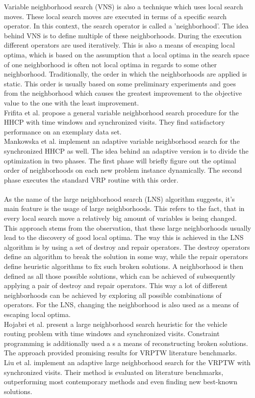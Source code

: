 Variable neighborhood search (VNS) is also a technique which uses local search moves. These local search moves are executed in terms of a specific search operator. In this context, the search operator is called a 'neighborhood'. The idea behind VNS is to define multiple of these neighborhoods. During the execution different operators are used iteratively. This is also a means of escaping local optima, which is based on the assumption that a local optima in the search space of one neighborhood is often not local optima in regards to some other neighborhood. Traditionally, the order in which the neighborhoods are applied is static. This order is usually based on some preliminary experiments and goes from the neighborhood which causes the greatest improvement to the objective value to the one with the least improvement.\\
Frifita et al. \cite{frifita_general_2017} propose a general variable neighborhood search procedure for the HHCP with time windows and synchronized visits. They find satisfactory performance on an exemplary data set.\\ 
Mankowska et al. \cite{mankowska_home_2014} implement an adaptive variable neighborhood search for the synchronized HHCP as well. The idea behind an adaptive version is to divide the optimization in two phases. The first phase will briefly figure out the optimal order of neighborhoods on each new problem instance dynamically. The second phase executes the standard VRP routine with this order.\\ \\
As the name of the large neighborhood search (LNS) algorithm suggests, it's main feature is the usage of large neighborhoods. This refers to the fact, that in every local search move a relatively big amount of variables is being changed. This approach stems from the observation, that these large neighborhoods usually lead to the discovery of good local optima. The way this is achieved in the LNS algorithm is by using a set of destroy and repair operators. The destroy operators define an algorithm to break the solution in some way, while the repair operators define heuristic algorithms to fix such broken solutions. A neighborhood is then defined as all those possible solutions, which can be achieved of subsequently applying a pair of destroy and repair operators. This way a lot of different neighborhoods can be achieved by exploring all possible combinations of operators. For the LNS, changing the neighborhood is also used as a means of escaping local optima.\\
Hojabri et al. \cite{hojabri_large_2018} present a large neighborhood search heuristic for the vehicle routing problem with time windows and synchronized visits. Constraint programming is additionally used a s a means of reconstructing broken solutions. The approach provided promising results for VRPTW literature benchmarks.\\
Liu et al. \cite{liu_adaptive_2019} implement an adaptive large neighborhood search for the VRPTW with synchronized visits. Their method is evaluated on literature benchmarks, outperforming most contemporary methods and even finding new best-known solutions.


